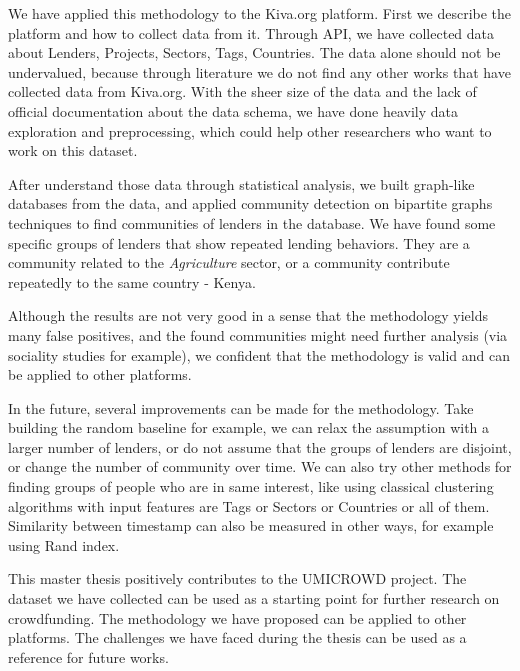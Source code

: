 We have applied this methodology to the Kiva.org platform.
First we describe the platform and how to collect data from it.
Through API, we have collected data about Lenders, Projects, Sectors, Tags, Countries.
The data alone should not be undervalued,
because through literature we do not find any other works that have collected data from Kiva.org.
With the sheer size of the data and the lack of official documentation about the data schema,
we have done heavily data exploration and preprocessing,
which could help other researchers who want to work on this dataset.

After understand those data through statistical analysis,
we built graph-like databases from the data,
and applied community detection on bipartite graphs techniques to find communities of lenders in the database.
We have found some specific groups of lenders that show repeated lending behaviors.
They are a community related to the \textit{Agriculture} sector,
or a community contribute repeatedly to the same country - Kenya.

Although the results are not very good in a sense that the methodology yields many false positives,
and the found communities might need further analysis (via sociality studies for example),
we confident that the methodology is valid and can be applied to other platforms.

In the future, several improvements can be made for the methodology.
Take building the random baseline for example,
we can relax the assumption with a larger number of lenders,
or do not assume that the groups of lenders are disjoint,
or change the number of community over time.
We can also try other methods for finding groups of people who are in same interest,
like using classical clustering algorithms with input features are Tags or Sectors or Countries or all of them.
Similarity between timestamp can also be measured in other ways, for example using Rand index.

This master thesis positively contributes to the UMICROWD project.
The dataset we have collected can be used as a starting point for further research on crowdfunding.
The methodology we have proposed can be applied to other platforms.
The challenges we have faced during the thesis can be used as a reference for future works.






